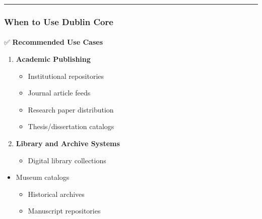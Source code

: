 \documentclass[
  letterpaper,
  DIV=11,
  numbers=noendperiod]{scrartcl}
\makeatletter
\let\oldparagraph\paragraph
\renewcommand{\paragraph}{
    \@ifstar
      \xxxParagraphStar
      \xxxParagraphNoStar
  }
\newcommand{\xxxParagraphStar}[1]{\oldparagraph*{#1}\mbox{}}
\newcommand{\xxxParagraphNoStar}[1]{\oldparagraph{#1}\mbox{}}
\providecommand{\tightlist}{%
  \setlength{\itemsep}{0pt}\setlength{\parskip}{0pt}}\usepackage{longtable,booktabs,array}
\makeatother
\begin{document}
\begin{center}\rule{0.5\linewidth}{0.5pt}\end{center}

\subsubsection{When to Use Dublin Core}\label{when-to-use-dublin-core}

\paragraph{\texorpdfstring{✅ \textbf{Recommended Use
Cases}}{✅ Recommended Use Cases}}\label{recommended-use-cases}

\begin{enumerate}
\def\labelenumi{\arabic{enumi}.}
\tightlist
\item
  \textbf{Academic Publishing}

  \begin{itemize}
  \tightlist
  \item
    Institutional repositories
  \item
    Journal article feeds
  \item
    Research paper distribution
  \item
    Thesis/dissertation catalogs
  \end{itemize}
\item
  \textbf{Library and Archive Systems}

  \begin{itemize}
  \tightlist
  \item
    Digital library collections
  \end{itemize}
\end{enumerate}

\begin{itemize}
\tightlist
\item
  Museum catalogs

  \begin{itemize}
  \tightlist
  \item
    Historical archives
  \item
    Manuscript repositories
  \end{itemize}
\end{itemize}
\end{document}

